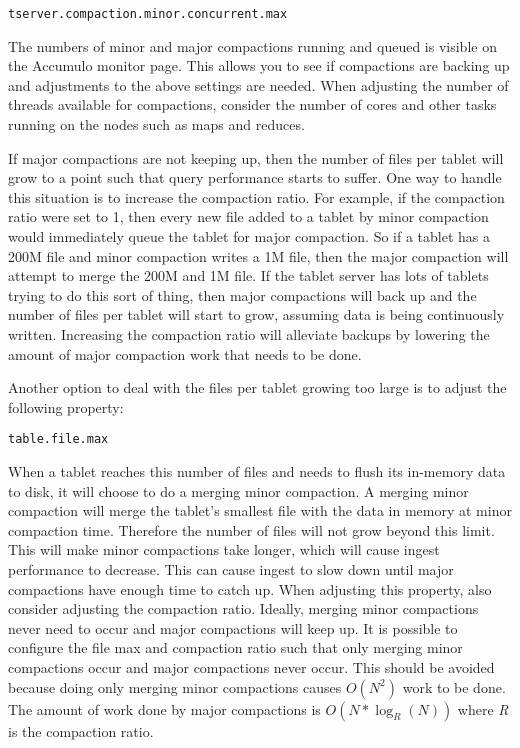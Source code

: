 \begingroup\fontsize{8pt}{8pt}\selectfont\begin{verbatim}
tserver.compaction.minor.concurrent.max
\end{verbatim}\endgroup

The numbers of minor and major compactions running and queued is visible on the
Accumulo monitor page. This allows you to see if compactions are backing up
and adjustments to the above settings are needed. When adjusting the number of
threads available for compactions, consider the number of cores and other tasks
running on the nodes such as maps and reduces.

If major compactions are not keeping up, then the number of files per tablet
will grow to a point such that query performance starts to suffer. One way to
handle this situation is to increase the compaction ratio. For example, if the
compaction ratio were set to 1, then every new file added to a tablet by minor
compaction would immediately queue the tablet for major compaction. So if a
tablet has a 200M file and minor compaction writes a 1M file, then the major
compaction will attempt to merge the 200M and 1M file. If the tablet server
has lots of tablets trying to do this sort of thing, then major compactions
will back up and the number of files per tablet will start to grow, assuming
data is being continuously written. Increasing the compaction ratio will
alleviate backups by lowering the amount of major compaction work that needs to
be done.

Another option to deal with the files per tablet growing too large is to adjust
the following property:

\begingroup\fontsize{8pt}{8pt}\selectfont\begin{verbatim}
table.file.max  
\end{verbatim}\endgroup

When a tablet reaches this number of files and needs to flush its in-memory
data to disk, it will choose to do a merging minor compaction. A merging minor
compaction will merge the tablet's smallest file with the data in memory at
minor compaction time. Therefore the number of files will not grow beyond this
limit. This will make minor compactions take longer, which will cause ingest
performance to decrease. This can cause ingest to slow down until major
compactions have enough time to catch up. When adjusting this property, also
consider adjusting the compaction ratio. Ideally, merging minor compactions
never need to occur and major compactions will keep up. It is possible to
configure the file max and compaction ratio such that only merging minor
compactions occur and major compactions never occur. This should be avoided
because doing only merging minor compactions causes $O(N^2)$ work to be done.
The amount of work done by major compactions is $O(N*\log_R(N))$ where
\textit{R} is the compaction ratio.

